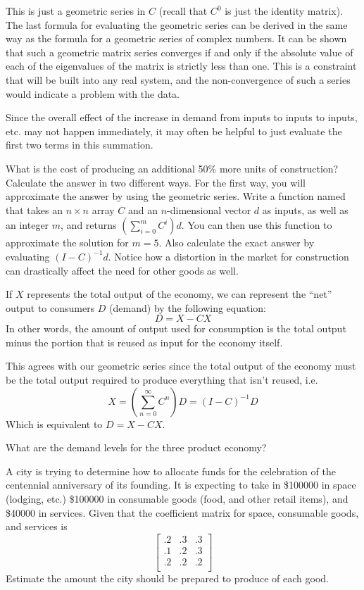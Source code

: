 This is just a geometric series in $C$ (recall that $C^0$ is just the identity matrix).
The last formula for evaluating the geometric series can be derived in the same way as the formula for a geometric series of complex numbers.
It can be shown that such a geometric matrix series converges if and only if the absolute value of each of the eigenvalues of the matrix is strictly less than one.
This is a constraint that will be built into any real system, and the non-convergence of such a series would indicate a problem with the data.

Since the overall effect of the increase in demand from inputs to inputs to inputs, etc. may not happen immediately, it may often be helpful to just evaluate the first two terms in this summation.

\begin{problem}
What is the cost of producing an additional 50\% more units of construction?
Calculate the answer in two different ways.
For the first way, you will approximate the answer by using the geometric series.
Write a function named  that takes an $n \times n$ array $C$ and an $n$-dimensional
vector $d$ as inputs, as well as an integer $m$, and returns $(\sum_{i=0}^m C^i)d$.
You can then use this function to approximate the solution for $m=5$.
Also calculate the exact answer by evaluating $(I-C)^{-1}d$.
Notice how a distortion in the market for construction can drastically affect the need for other goods as well.
\end{problem}

If $X$ represents the total output of the economy, we can represent the ``net'' output to consumers $D$ (demand) by the following equation:
\[ D = X - C X \]
In other words, the amount of output used for consumption is the total output minus the portion that is reused as input for the economy itself.

This agrees with our geometric series since the total output of the economy must be the total output required to produce everything that isn't reused, i.e.
\[ X = \left( \sum_{n=0}^{\infty} C^n \right) D = \left( I - C \right)^{-1} D \]
Which is equivalent to $ D = X - C X $.

\begin{problem}
What are the demand levels for the three product economy?
\end{problem}

\begin{problem}
A city is trying to determine how to allocate funds for the celebration of the centennial anniversary of its founding.
It is expecting to take in \$100000 in space (lodging, etc.) \$100000 in consumable goods (food, and other retail items), and \$40000 in services.
Given that the coefficient matrix for space, consumable goods, and services is
\[ \begin{bmatrix}
.2 & .3 & .3 \\
.1 & .2 & .3 \\
.2 & .2 & .2 \\
\end{bmatrix} \]
Estimate the amount the city should be prepared to produce of each good.
\end{problem}


